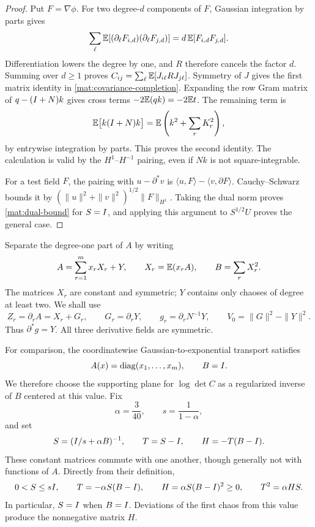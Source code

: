 \begin{proof}
Put $F=\nabla\phi$.  For two degree-$d$ components of $F$, Gaussian
integration by parts gives
\[
 \sum_\ell\mathbb E[(\partial_\ell F_{i,d})(\partial_\ell F_{j,d})]
 =d\,\mathbb E[F_{i,d}F_{j,d}].
\]
Differentiation lowers the degree by one, and $R$ therefore cancels the
factor $d$.  Summing over $d\ge1$ proves
$C_{ij}=\sum_\ell\mathbb E[J_{i\ell}R J_{j\ell}]$.  Symmetry of $J$ gives
the first matrix identity in \eqref{mat:covariance-completion}.
Expanding the row Gram matrix of $q-(I+N)k$ gives cross terms
$-2\mathbb E(qk)=-2\mathbb E t$.  The remaining term is
\[
 \mathbb E\bigl[k(I+N)k\bigr]
   =\mathbb E\left(k^2+\sum_r K_r^2\right),
\]
by entrywise integration by parts.  This proves the second identity.
The calculation is valid by the $H^1$--$H^{-1}$ pairing, even if $Nk$
is not square-integrable.

For a test field $F$, the pairing with $u-\partial^*v$ is
$\langle u,F\rangle-\langle v,\partial F\rangle$.  Cauchy--Schwarz
bounds it by
$(\|u\|^2+\|v\|^2)^{1/2}\|F\|_{H^1}$.  Taking the dual norm proves
\eqref{mat:dual-bound} for $S=I$, and applying this argument to
$S^{1/2}U$ proves the general case.
\end{proof}

Separate the degree-one part of $A$ by writing
\begin{equation}\label{mat:chaos}
 A=\sum_{r=1}^m x_rX_r+Y,\qquad
 X_r=\mathbb E(x_rA),\qquad B=\sum_rX_r^2.
\end{equation}
The matrices $X_r$ are constant and symmetric; $Y$ contains only chaoses
of degree at least two.  We shall use
\begin{equation}\label{mat:gradient-fields}
 Z_r=\partial_rA=X_r+G_r,\qquad
 G_r=\partial_rY,\qquad
 g_r=\partial_rN^{-1}Y,
 \qquad V_0=\|G\|^2-\|Y\|^2.
\end{equation}
Thus $\partial^*g=Y$.  All three derivative fields are symmetric.

For comparison, the coordinatewise Gaussian-to-exponential transport
satisfies
\[
 A(x)=\operatorname{diag}(x_1,\ldots,x_m),\qquad B=I.
\]
We therefore choose the supporting plane for $\log\det C$ as a
regularized inverse of $B$ centered at this value.  Fix
\begin{equation}\label{mat:dual-constants}
 \alpha=\frac{3}{40},\qquad s=\frac1{1-\alpha},
\end{equation}
and set
\begin{equation}\label{mat:dual-matrices}
 S=(I/s+\alpha B)^{-1},\qquad T=S-I,
 \qquad H=-T(B-I).
\end{equation}
These constant matrices commute with one another, though generally not
with functions of $A$.  Directly from their definition,
\begin{equation}\label{mat:dual-relations}
 0<S\le sI,\qquad T=-\alpha S(B-I),\qquad
 H=\alpha S(B-I)^2\ge0,\qquad T^2=\alpha HS.
\end{equation}
In particular, $S=I$ when $B=I$.  Deviations of the first chaos from
this value produce the nonnegative matrix $H$.

